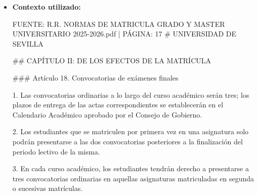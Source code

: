 \documentclass{article}
\begin{document}
\begin{itemize}
\begin{itemize}
                Según las normas de evaluación de la Universidad de Sevilla, específicamente en el artículo 20.3 de las Normas de Matrícula Grado y Master Universitario 2025-2026, se establece que "No se computarán las convocatorias en las que el estudiante figure en acta con la mención de “No Presentado”".

                Por lo tanto, si no te presentas físicamente a la primera convocatoria ordinaria del primer cuatrimestre, no se consumirá ninguna convocatoria a efectos de las normas de permanencia, ya que no figurarás en acta con una calificación, sino con la mención de "No Presentado".

                Es importante tener en cuenta que, según el artículo 22.2 de la misma normativa, los estudiantes que se matriculen por primera vez en una asignatura solo podrán presentarse a las dos convocatorias posteriores a la finalización del periodo lectivo de la misma. Sin embargo, en este caso, no se consume ninguna convocatoria al no presentarte a la primera convocatoria.

                En resumen, no consumirás ninguna convocatoria a efectos de las normas de permanencia si no te presentas a la primera convocatoria ordinaria del primer cuatrimestre, siempre y cuando no figure en acta con una calificación.
          \item \textbf{Contexto utilizado:}
                \begin{scriptsize}
                  FUENTE: R.R. NORMAS DE MATRICULA GRADO Y MASTER UNIVERSITARIO 2025-2026.pdf | PÁGINA: 17
                  \# UNIVERSIDAD DE SEVILLA

                  \#\# CAPÍTULO II: DE LOS EFECTOS DE LA MATRÍCULA

                  \#\#\# Artículo 18. Convocatorias de exámenes finales

                  1. Las convocatorias ordinarias a lo largo del curso académico serán tres; los plazos de entrega de las actas correspondientes se establecerán en el Calendario Académico aprobado por el Consejo de Gobierno.

                  2. Los estudiantes que se matriculen por primera vez en una asignatura solo podrán presentarse a las dos convocatorias posteriores a la finalización del periodo lectivo de la misma.

                  3. En cada curso académico, los estudiantes tendrán derecho a presentarse a tres convocatorias ordinarias en aquellas asignaturas matriculadas en segunda o sucesivas matrículas.


\end{scriptsize}
\end{itemize}
\end{itemize}
\end{document}
